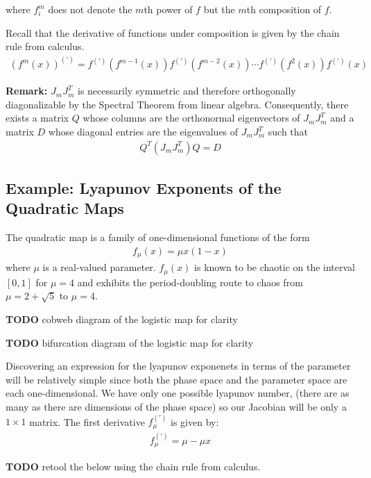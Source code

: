 \documentclass{elsart1p}
\begin{document}
where $f_{i}^{m}$ does not denote the $m$th power of $f$ but the $m$th 
composition of $f$.

Recall that the derivative of functions under composition is given
by the chain rule from calculus.
\begin{eqnarray}
(f^{m}(x))^{(\prime)} = f^{(\prime)}(f^{m-1}(x)) f^{(\prime)}(f^{m-2}(x)) \cdots f^{(\prime)}(f^{2}(x))  f^{(\prime)}(x) 
\end{eqnarray}

\textbf{Remark:} $J_{m}J_{m}^{T}$ is necessarily symmetric and therefore orthogonally
diagonalizable by the Spectral Theorem from linear algebra.  Consequently,
there exists a matrix $Q$ whose columns are the orthonormal eigenvectors of
$J_{m}J_{m}^{T}$ and a matrix $D$ whose diagonal entries are the eigenvalues
of $J_{m}J_{m}^{T}$ such that
\begin{eqnarray}
Q^{T}(J_{m}J_{m}^{T})Q = D
\end{eqnarray}

\subsection{Example:  Lyapunov Exponents of the Quadratic Maps}
The quadratic map is a family of one-dimensional functions of the form 
\begin{eqnarray}
f_{\mu}(x) = \mu x (1-x)
\end{eqnarray}
 where $\mu$ is a real-valued parameter.
$f_{\mu}(x)$ is known to be chaotic on the interval $[0,1]$ for $\mu=4$ and
exhibits the period-doubling route to chaos from $\mu=2+\sqrt{5}$ to $\mu=4$.

\textbf{TODO} cobweb diagram of the logistic map for clarity

\textbf{TODO} bifurcation diagram of the logistic map for clarity

Discovering an expression for the lyapunov exponenets in terms of the 
parameter
will be relatively simple since both the phase space and the parameter space
are each one-dimensional.  We have only one possible lyapunov number, (there
are as many as there are dimensions of the phase space) so our Jacobian
will be only a $1 \times 1$ matrix.  The first derivative $f_{\mu}^{(\prime)}$ is given by:
\begin{eqnarray}
f_{\mu}^{(\prime)} = \mu - \mu x
\end{eqnarray}

\textbf{TODO} retool the below using the chain rule from calculus.
\end{document}
